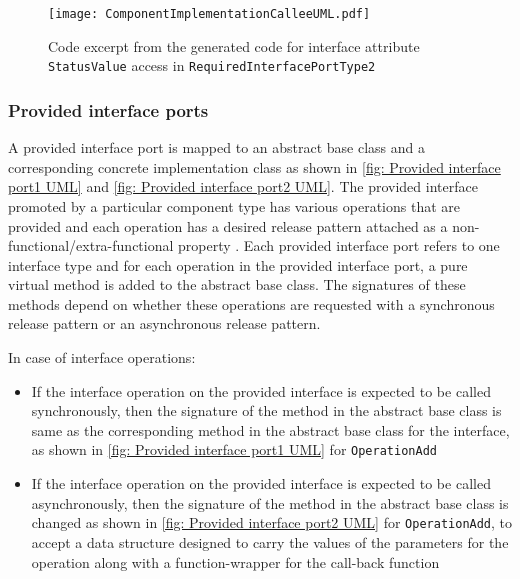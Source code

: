 \begin{figure}[h]
	\centering
	\texttt{[image: ComponentImplementationCalleeUML.pdf]}
	\caption{Code excerpt from the generated code for interface attribute \texttt{StatusValue} access in \texttt{Required\allowbreak InterfacePort\allowbreak Type2}}
	\label{fig: Component implementation Callee UML}
\end{figure}

\subsubsection{\textbf{Provided interface ports}}
A provided interface port is mapped to an abstract base class and a corresponding concrete implementation class as shown in \cref{fig: Provided interface port1 UML} and \cref{fig: Provided interface port2 UML}. The provided interface promoted by a particular component type has various operations that are provided and each operation has a desired release pattern attached as a non-functional/extra-functional property \cite{SpecMetamodel,CompBasedProcess}. Each provided interface port refers to one interface type and for each operation in the provided interface port, a pure virtual method is added to the abstract base class. The signatures of these methods depend on whether these operations are requested with a synchronous release pattern or an asynchronous release pattern.

In case of interface operations:
\begin{itemize}
\item If the interface operation on the provided interface is expected to be called synchronously, then the signature of the method in the abstract base class is same as the corresponding method in the abstract base class for the interface, as shown in \cref{fig: Provided interface port1 UML} for \texttt{OperationAdd}
\item If the interface operation on the provided interface is expected to be called asynchronously, then the signature of the method in the abstract base class is changed as shown in \cref{fig: Provided interface port2 UML} for \texttt{OperationAdd}, to accept a data structure designed to carry the values of the parameters for the operation along with a function-wrapper for the call-back function     
\end{itemize}   

